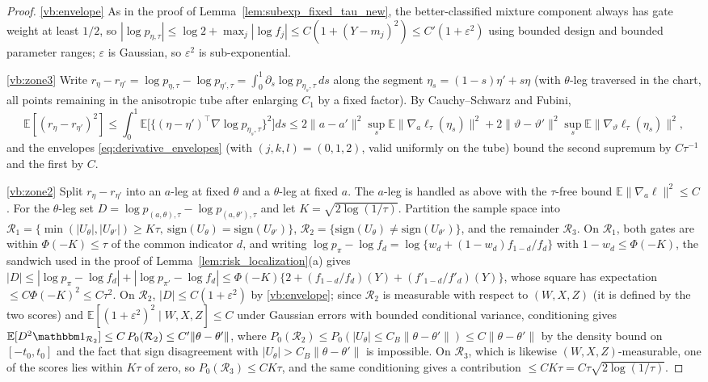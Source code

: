 \documentclass[11pt]{article}
\theoremstyle{definition}
\theoremstyle{plain}
\newcommand{\E}{\mathbb{E}}
\begin{document}
\begin{proof}
\ref{vb:envelope} As in the proof of Lemma~\ref{lem:subexp_fixed_tau_new}, the better-classified mixture component always has gate weight at least $1/2$, so
$|\log p_{\eta,\tau}|\le\log2+\max_j|\log f_j|\le C(1+(Y-m_j)^2)\le C'(1+\varepsilon^2)$
using bounded design and bounded parameter ranges; $\varepsilon$ is Gaussian, so $\varepsilon^2$ is sub-exponential.

\ref{vb:zone3} Write $r_\eta-r_{\eta'}=\log p_{\eta,\tau}-\log p_{\eta',\tau}=\int_0^1\partial_s\log p_{\eta_s,\tau}\,ds$ along the segment $\eta_s=(1-s)\eta'+s\eta$ (with $\theta$-leg traversed in the chart, all points remaining in the anisotropic tube after enlarging $C_1$ by a fixed factor). By Cauchy--Schwarz and Fubini,
\[
\E[(r_\eta-r_{\eta'})^2]\le\int_0^1\E\big[\{(\eta-\eta')^\top\nabla\log p_{\eta_s,\tau}\}^2\big]ds
\le2\|a-a'\|^2\sup_s\E\|\nabla_a\ell_{\tau}(\eta_s)\|^2
+2\|\vartheta-\vartheta'\|^2\sup_s\E\|\nabla_\vartheta\ell_\tau(\eta_s)\|^2,
\]
and the envelopes \eqref{eq:derivative_envelopes} (with $(j,k,l)=(0,1,2)$, valid uniformly on the tube) bound the second supremum by $C\tau^{-1}$ and the first by $C$.

\ref{vb:zone2} Split $r_\eta-r_{\eta'}$ into an $a$-leg at fixed $\theta$ and a $\theta$-leg at fixed $a$. The $a$-leg is handled as above with the $\tau$-free bound $\E\|\nabla_a\ell\|^2\le C$. For the $\theta$-leg set $D=\log p_{(a,\theta),\tau}-\log p_{(a,\theta'),\tau}$ and let $K=\sqrt{2\log(1/\tau)}$. Partition the sample space into
$\mathcal R_1=\{\min(|U_\theta|,|U_{\theta'}|)\ge K\tau,\ \mathrm{sign}(U_\theta)=\mathrm{sign}(U_{\theta'})\}$,
$\mathcal R_2=\{\mathrm{sign}(U_\theta)\neq\mathrm{sign}(U_{\theta'})\}$, and the remainder $\mathcal R_3$.
On $\mathcal R_1$, both gates are within $\Phi(-K)\le\tau$ of the common indicator $d$, and writing
$\log p_{\pi}-\log f_d=\log\{w_d+(1-w_d)f_{1-d}/f_d\}$ with $1-w_d\le\Phi(-K)$, the sandwich used in the proof of Lemma~\ref{lem:risk_localization}(a) gives $|D|\le|{\log p_\pi-\log f_d}|+|{\log p_{\pi'}-\log f_d}|\le\Phi(-K)\{2+ (f_{1-d}/f_d)(Y)+(f'_{1-d}/f'_d)(Y)\}$, whose square has expectation $\le C\Phi(-K)^2\le C\tau^2$. On $\mathcal R_2$, $|D|\le C(1+\varepsilon^2)$ by \ref{vb:envelope}; since $\mathcal R_2$ is measurable with respect to $(W,X,Z)$ (it is defined by the two scores) and $\E[(1+\varepsilon^2)^2\mid W,X,Z]\le C$ under Gaussian errors with bounded conditional variance, conditioning gives $\E[D^2\mathbbm 1_{\mathcal R_2}]\le C\,P_0(\mathcal R_2)\le C'\|\theta-\theta'\|$, where $P_0(\mathcal R_2)\le P_0(|U_\theta|\le C_B\|\theta-\theta'\|)\le C\|\theta-\theta'\|$ by the density bound on $[-t_0,t_0]$ and the fact that sign disagreement with $|U_\theta|>C_B\|\theta-\theta'\|$ is impossible. On $\mathcal R_3$, which is likewise $(W,X,Z)$-measurable, one of the scores lies within $K\tau$ of zero, so $P_0(\mathcal R_3)\le CK\tau$, and the same conditioning gives a contribution $\le CK\tau=C\tau\sqrt{2\log(1/\tau)}$.
\end{proof}
\end{document}
